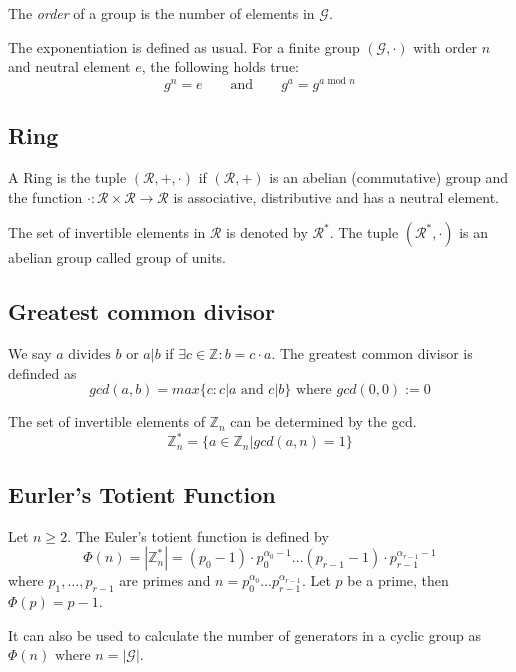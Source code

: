 The \emph{order} of a group is the number of elements in
\(\mathcal{G}\).

The exponentiation is defined as usual. For a finite group
\((\mathcal{G}, \cdot)\) with order \(n\) and neutral element \(e\), the
following holds true:
\[ g^n = e \quad\quad\text{and}\quad\quad g^a = g^{a \text{ mod } n}\]

\hypertarget{ring}{%
\subsection{Ring}\label{ring}}

A Ring is the tuple \((\mathcal{R}, +, \cdot)\) if \((\mathcal{R}, +)\)
is an abelian (commutative) group and the function
\(\cdot : \mathcal{R} \times \mathcal{R} \rightarrow \mathcal{R}\) is
associative, distributive and has a neutral element.

The set of invertible elements in \(\mathcal{R}\) is denoted by
\(\mathcal{R}^*\). The tuple \((\mathcal{R}^*, \cdot)\) is an abelian
group called group of units.

\hypertarget{greatest-common-divisor}{%
\subsection{Greatest common divisor}\label{greatest-common-divisor}}

We say \(a \text{ divides } b\) or \(a | b\) if
\(\exists c \in \mathbb{Z} : b = c \cdot a\). The greatest common
divisor is definded as
\[gcd(a, b) = max\{c : c | a \text{ and } c | b\} \text{ where } gcd(0,0) := 0\]

The set of invertible elements of \(\mathbb{Z}_n\) can be determined by
the gcd. \[\mathbb{Z}_n^* = \{a \in \mathbb{Z}_n | gcd(a, n) = 1\}\]

\hypertarget{eurlers-totient-function}{%
\subsection{Eurler's Totient Function}\label{eurlers-totient-function}}

Let \(n \geq 2\). The Euler's totient function is defined by
\[\Phi(n) = | \mathbb{Z}_n^* | = (p_0 - 1) \cdot p_0^{\alpha_0 - 1} \dots (p_{r-1} - 1) \cdot p_{r-1}^{\alpha_{r-1} - 1}\]
where \(p_1, \dots, p_{r-1}\) are primes and
\(n = p_0^{\alpha_0} \dots p_{r-1}^{\alpha_{r-1}}\). Let \(p\) be a
prime, then \(\Phi(p) = p - 1\).

It can also be used to calculate the number of generators in a cyclic
group as \(\Phi(n) \text{ where } n = |\mathcal{G}|\).

